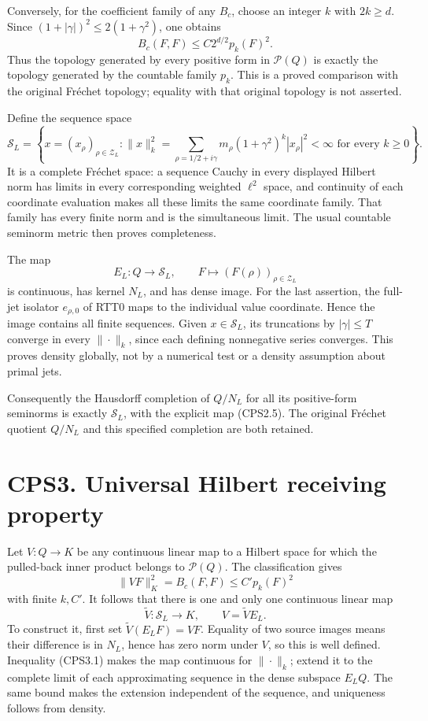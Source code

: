 Conversely, for the coefficient family of any \(B_c\), choose an integer
\(k\) with \(2k\ge d\). Since \((1+|\gamma|)^2\le2(1+\gamma^2)\), one
obtains \[
B_c(F,F)\le C2^{d/2}p_k(F)^2.
\tag{CPS2.3}
\] Thus the topology generated by every positive form in
\(\mathscr P(Q)\) is exactly the topology generated by the countable
family \(p_k\). This is a proved comparison with the original Fréchet
topology; equality with that original topology is not asserted.

Define the sequence space \[
\mathcal S_L=
\left\{x=(x_\rho)_{\rho\in\mathscr Z_L}:
\|x\|_k^2=\sum_{\rho=1/2+i\gamma}m_\rho
(1+\gamma^2)^k|x_\rho|^2<\infty
\text{ for every }k\ge0\right\}.
\tag{CPS2.4}
\] It is a complete Fréchet space: a sequence Cauchy in every displayed
Hilbert norm has limits in every corresponding weighted \(\ell^2\)
space, and continuity of each coordinate evaluation makes all these
limits the same coordinate family. That family has every finite norm and
is the simultaneous limit. The usual countable seminorm metric then
proves completeness.

The map \[
E_L:Q\longrightarrow\mathcal S_L,\qquad
F\longmapsto(F(\rho))_{\rho\in\mathscr Z_L}
\tag{CPS2.5}
\] is continuous, has kernel \(N_L\), and has dense image. For the last
assertion, the full-jet isolator \(e_{\rho,0}\) of RTT0 maps to the
individual value coordinate. Hence the image contains all finite
sequences. Given \(x\in\mathcal S_L\), its truncations by
\(|\gamma|\le T\) converge in every \(\|\cdot\|_k\), since each defining
nonnegative series converges. This proves density globally, not by a
numerical test or a density assumption about primal jets.

Consequently the Hausdorff completion of \(Q/N_L\) for all its
positive-form seminorms is exactly \(\mathcal S_L\), with the explicit
map (CPS2.5). The original Fréchet quotient \(Q/N_L\) and this specified
completion are both retained.

\section{CPS3. Universal Hilbert receiving
property}\label{cps3.-universal-hilbert-receiving-property}

Let \(V:Q\to K\) be any continuous linear map to a Hilbert space for
which the pulled-back inner product belongs to \(\mathscr P(Q)\). The
classification gives \[
\|VF\|_K^2=B_c(F,F)\le C' p_k(F)^2
\tag{CPS3.1}
\] with finite \(k,C'\). It follows that there is one and only one
continuous linear map \[
\widetilde V:\mathcal S_L\longrightarrow K,
\qquad V=\widetilde V E_L.
\tag{CPS3.2}
\] To construct it, first set \(\widetilde V(E_LF)=VF\). Equality of two
source images means their difference is in \(N_L\), hence has zero norm
under \(V\), so this is well defined. Inequality (CPS3.1) makes the map
continuous for \(\|\cdot\|_k\); extend it to the complete limit of each
approximating sequence in the dense subspace \(E_LQ\). The same bound
makes the extension independent of the sequence, and uniqueness follows
from density.

